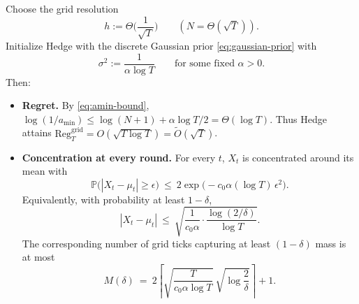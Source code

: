 \documentclass[11pt]{article}
\begin{document}
Choose the grid resolution
\[
    h := \Theta\!\Big(\frac{1}{\sqrt{T}}\Big)\qquad (N=\Theta(\sqrt{T})).
\]
Initialize Hedge with the discrete Gaussian prior \eqref{eq:gaussian-prior} with
\[
    \sigma^2 := \frac{1}{\alpha \log T}\qquad \text{for some fixed }\alpha>0.
\]
Then:
\begin{itemize}
    \item \textbf{Regret.} By \eqref{eq:amin-bound}, $\log(1/a_{\min}) \le \log(N+1)+\alpha \log T/2 = \Theta(\log T)$.
          Thus Hedge attains $\mathrm{Reg}^{\mathrm{grid}}_T = O(\sqrt{T\log T})=\widetilde{O}(\sqrt{T})$.
    \item \textbf{Concentration at every round.} For every $t$, $X_t$ is concentrated around its mean with
          \[
              \mathbb{P}\big(|X_t-\mu_t|\ge \epsilon\big)\ \le\ 2\exp\!\big(-c_0 \alpha (\log T)\,\epsilon^2\big).
          \]
          Equivalently, with probability at least $1-\delta$,
          \[
              |X_t-\mu_t|\ \le\ \sqrt{\frac{1}{c_0\alpha}\cdot \frac{\log(2/\delta)}{\log T}}.
          \]
          The corresponding number of grid ticks capturing at least $(1-\delta)$ mass is at most
          \[
              M(\delta)
              \ =\
              2\left\lceil
              \sqrt{\frac{T}{c_0\alpha\log T}}\ \sqrt{\log\frac{2}{\delta}}
              \right\rceil + 1.
          \]
\end{itemize}


\end{document}
